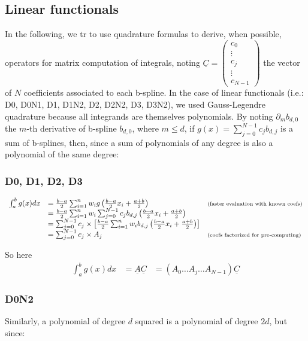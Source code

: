 \documentclass[paper=a4, fontsize=11pt]{book}
\numberwithin{equation}{section}		%
\numberwithin{figure}{section}			%
\numberwithin{table}{section}				%
\begin{document}
\subsection{Linear functionals}


In the following, we tr to use quadrature formulas to derive, when possible, operators for matrix computation of integrals, noting $\underline{C}=\left(\begin{array}{l}c_0\\ \vdots \\ c_j \\ \vdots \\ c_{N-1}\end{array}\right)$ the vector of $N$ coefficients associated to each b-spline.
In the case of linear functionals (i.e.: D0, D0N1, D1, D1N2, D2, D2N2, D3, D3N2), we used Gauss-Legendre quadrature because all integrands are themselves polynomials.
By noting $\partial_m b_{d,0}$ the $m$-th derivative of b-spline $b_{d,0}$, where $m\leq d$, if $g(x)=\sum_{j=0}^{N-1} c_jb_{d,j}$ is a sum of b-splines, then, since a sum of polynomials of any degree is also a polynomial of the same degree:


\subsubsection{D0, D1, D2, D3}
$$
\begin{array}{lll}
\int_a^b g(x)dx & = \frac{b-a}{2}\sum_{i=1}^n w_ig\left(\frac{b-a}{2}x_i + \frac{a+b}{2}\right) & \text{\scriptsize (faster evaluation with known coefs)}\\
& = \frac{b-a}{2}\sum_{i=1}^n w_i \sum_{j=0}^{N-1} c_jb_{d,j}\left(\frac{b-a}{2}x_i + \frac{a+b}{2}\right) & \\
& = \sum_{j=0}^{N-1} c_j \times \left[ \frac{b-a}{2}\sum_{i=1}^n w_ib_{d,j}\left(\frac{b-a}{2}x_i + \frac{a+b}{2}\right) \right]& \\
& = \sum_{j=0}^{N-1} c_j \times A_j& \text{\scriptsize (coefs factorized for pre-computing)}
\end{array}
$$

So here
$$
\begin{array}{lll}
\int_a^b g(x)dx & = \underline{A}\underline{C} & = \left( A_0 \hdots A_j \hdots A_{N-1} \right)\underline{C}
\end{array}
$$

\subsubsection{D0N2}
Similarly, a polynomial of degree $d$ squared is a polynomial of degree $2d$, but since:
\end{document}
